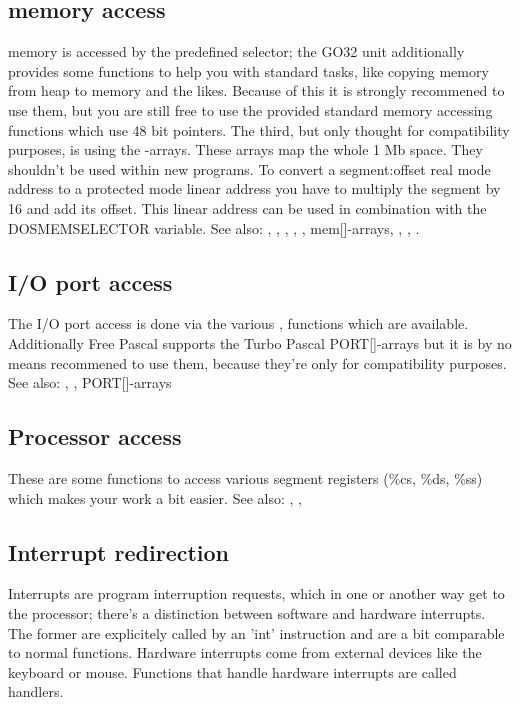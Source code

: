 \subsection{\dos memory access}
\dos memory is accessed by the predefined  selector; 
the GO32 unit additionally provides some functions to help you with standard tasks,
like copying memory from heap to \dos memory and the likes. Because of this
it is strongly recommened to use them, but you are still free to use the
provided standard memory accessing functions which use 48 bit pointers. The
third, but only thought for compatibility purposes, is using the
-arrays. These arrays map the whole 1 Mb \dos space. They shouldn't be
used within new programs.
To convert a segment:offset real mode address to a protected mode linear
address you have to multiply the segment by 16 and add its offset. This
linear address can be used in combination with the DOSMEMSELECTOR variable.
See also: 
,
,
,
,
,
mem[]-arrays, 
,
,
. 
\subsection{I/O port access}
The I/O port access is done via the various , 
functions
which are available. Additionally Free Pascal supports the Turbo Pascal
PORT[]-arrays but it is by no means recommened to use them, because they're
only for compatibility purposes.
See also: , , PORT[]-arrays
\subsection{Processor access}
These are some functions to access various segment registers (\%cs, \%ds, \%ss)
which makes your work a bit easier.
See also: , , 
\subsection{Interrupt redirection}
Interrupts are program interruption requests, which in one or another way
get to the processor; there's a distinction between software and hardware
interrupts. The former are explicitely called by an 'int' instruction and
are a bit comparable to normal functions. Hardware interrupts come from
external devices like the keyboard or mouse. Functions that handle hardware
interrupts are called handlers.
